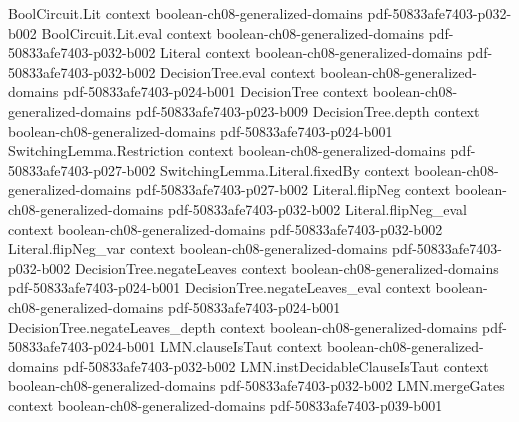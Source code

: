 \begin{theorem}
\label{BooleanAnalysis.plancherel}
\leanok
{}
\proofstep
  {BoolCircuit.Lit}
  {context}
  {boolean-ch08-generalized-domains}
  {pdf-50833afe7403-p032-b002}
\proofstep
  {BoolCircuit.Lit.eval}
  {context}
  {boolean-ch08-generalized-domains}
  {pdf-50833afe7403-p032-b002}
\proofstep
  {Literal}
  {context}
  {boolean-ch08-generalized-domains}
  {pdf-50833afe7403-p032-b002}
\proofstep
  {DecisionTree.eval}
  {context}
  {boolean-ch08-generalized-domains}
  {pdf-50833afe7403-p024-b001}
\proofstep
  {DecisionTree}
  {context}
  {boolean-ch08-generalized-domains}
  {pdf-50833afe7403-p023-b009}
\proofstep
  {DecisionTree.depth}
  {context}
  {boolean-ch08-generalized-domains}
  {pdf-50833afe7403-p024-b001}
\proofstep
  {SwitchingLemma.Restriction}
  {context}
  {boolean-ch08-generalized-domains}
  {pdf-50833afe7403-p027-b002}
\proofstep
  {SwitchingLemma.Literal.fixedBy}
  {context}
  {boolean-ch08-generalized-domains}
  {pdf-50833afe7403-p027-b002}
\proofstep
  {Literal.flipNeg}
  {context}
  {boolean-ch08-generalized-domains}
  {pdf-50833afe7403-p032-b002}
\proofstep
  {Literal.flipNeg_eval}
  {context}
  {boolean-ch08-generalized-domains}
  {pdf-50833afe7403-p032-b002}
\proofstep
  {Literal.flipNeg_var}
  {context}
  {boolean-ch08-generalized-domains}
  {pdf-50833afe7403-p032-b002}
\proofstep
  {DecisionTree.negateLeaves}
  {context}
  {boolean-ch08-generalized-domains}
  {pdf-50833afe7403-p024-b001}
\proofstep
  {DecisionTree.negateLeaves_eval}
  {context}
  {boolean-ch08-generalized-domains}
  {pdf-50833afe7403-p024-b001}
\proofstep
  {DecisionTree.negateLeaves_depth}
  {context}
  {boolean-ch08-generalized-domains}
  {pdf-50833afe7403-p024-b001}
\proofstep
  {LMN.clauseIsTaut}
  {context}
  {boolean-ch08-generalized-domains}
  {pdf-50833afe7403-p032-b002}
\proofstep
  {LMN.instDecidableClauseIsTaut}
  {context}
  {boolean-ch08-generalized-domains}
  {pdf-50833afe7403-p032-b002}
\proofstep
  {LMN.mergeGates}
  {context}
  {boolean-ch08-generalized-domains}
  {pdf-50833afe7403-p039-b001}

\end{theorem}
